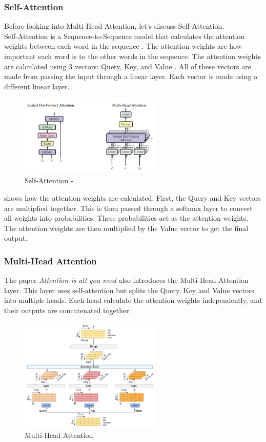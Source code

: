 \subsubsection{Self-Attention}
Before looking into Multi-Head Attention, let's discuss Self-Attention.\\
Self-Attention is a Sequence-to-Sequence model that calculates the attention weights between each word in the sequence \cite{attention}. The attention
weights are how important each word is to the other words in the sequence. The attention weights are calculated using 3 vectors:
Query, Key, and Value \cite{attention}. All of these vectors are made from passing the input through a linear layer. Each vector is made using a different
linear layer.
\begin{figure}[hbtp]
    \centering
    \includegraphics[width=0.6\textwidth]{../images/attention.png}
    \caption{Self-Attention - \cite{attention}}
    \label{fig:self-attention}
\end{figure} 

 shows how the attention weights are calculated. First, the Query and Key vectors are multiplied together.
This is then passed through a softmax layer to convert all weights into probabilities. These probabilities act as the attention weights.
The attention weights are then multiplied by the Value vector to get the final output.
\subsubsection{Multi-Head Attention}
The paper \textit{Attention is all you need} \cite{attention} also introduces the Multi-Head Attention layer. This layer uses self-attention
but splits the Query, Key and Value vectors into multiple heads. Each head calculate the attention weights independently, and their outputs
are concatenated together.
\begin{figure}[hbtp]
    \centering
    \includegraphics[width=0.6\textwidth]{../images/multi-head-attention.png}
    \caption{Multi-Head Attention}
    \label{fig:multi-head-attention}
\end{figure}

